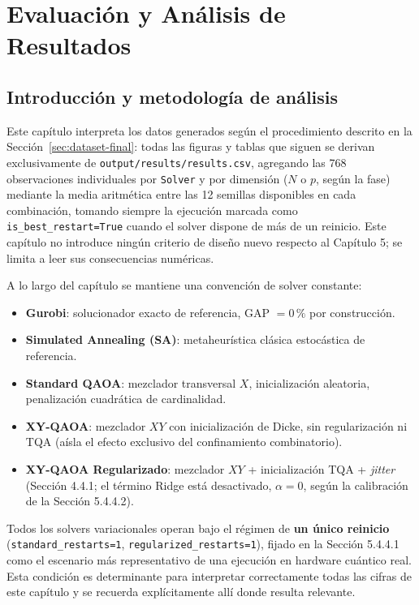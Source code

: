 \chapter{Evaluación y Análisis de Resultados}
\label{ch:resultados}

\section{Introducción y metodología de análisis}
\label{sec:intro-analisis}

Este capítulo interpreta los datos generados según el procedimiento descrito en la Sección~\ref{sec:dataset-final}: todas las figuras y tablas que siguen se derivan exclusivamente de \texttt{output/results/results.csv}, agregando las 768 observaciones individuales por \texttt{Solver} y por dimensión (\(N\) o \(p\), según la fase) mediante la media aritmética entre las 12 semillas disponibles en cada combinación, tomando siempre la ejecución marcada como \texttt{is\_best\_restart=True} cuando el solver dispone de más de un reinicio. Este capítulo no introduce ningún criterio de diseño nuevo respecto al Capítulo 5; se limita a leer sus consecuencias numéricas.

A lo largo del capítulo se mantiene una convención de solver constante:

\begin{itemize}
    \item \textbf{Gurobi}: solucionador exacto de referencia, GAP $=0\,\%$ por construcción.
    \item \textbf{Simulated Annealing (SA)}: metaheurística clásica estocástica de referencia.
    \item \textbf{Standard QAOA}: mezclador transversal $X$, inicialización aleatoria, penalización cuadrática de cardinalidad.
    \item \textbf{XY-QAOA}: mezclador $XY$ con inicialización de Dicke, sin regularización ni TQA (aísla el efecto exclusivo del confinamiento combinatorio).
    \item \textbf{XY-QAOA Regularizado}: mezclador $XY$ + inicialización TQA + \textit{jitter} (Sección 4.4.1; el término Ridge está desactivado, $\alpha=0$, según la calibración de la Sección 5.4.4.2).
\end{itemize}

Todos los solvers variacionales operan bajo el régimen de \textbf{un único reinicio} (\texttt{standard\_restarts=1}, \texttt{regularized\_restarts=1}), fijado en la Sección 5.4.4.1 como el escenario más representativo de una ejecución en hardware cuántico real. Esta condición es determinante para interpretar correctamente todas las cifras de este capítulo y se recuerda explícitamente allí donde resulta relevante.

